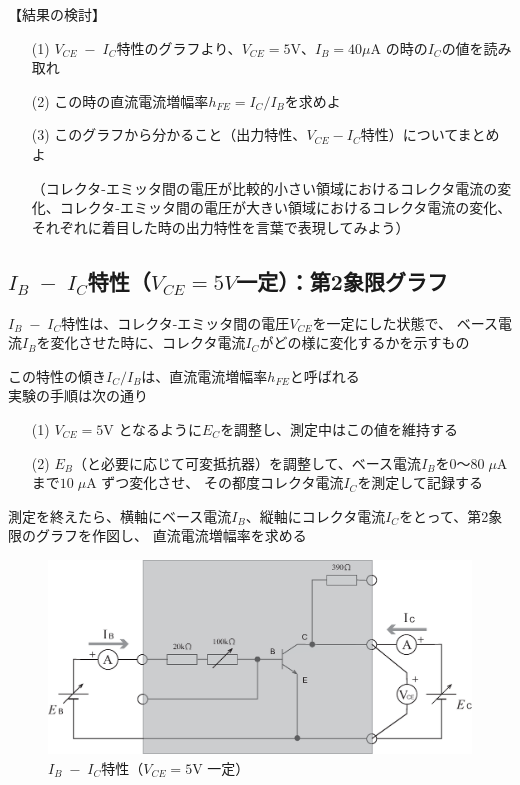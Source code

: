 \documentclass[uplatex,a4paper,11pt,oneside,openany]{jsbook}
\begin{document}
【結果の検討】

\begin{enumerate}
\item[(1)] $V_{CE}\;-\;I_C$特性のグラフより、$V_{CE}=5$V、$I_B=40\mu$A の時の$I_C$の値を読み取れ\\
\item[(2)] この時の直流電流増幅率$h_{FE}=I_C/I_B$を求めよ\\

\item[(3)] このグラフから分かること（出力特性、$V_{CE}-I_C$特性）についてまとめよ

	（コレクタ-エミッタ間の電圧が比較的小さい領域におけるコレクタ電流の変化、コレクタ-エミッタ間の電圧が大きい領域におけるコレクタ電流の変化、それぞれに着目した時の出力特性を言葉で表現してみよう）
\end{enumerate}

\newpage

\subsection{$I_B\;-\;I_C$特性（$V_{CE}=5V$一定）：第2象限グラフ}

$I_B\;-\;I_C$特性は、コレクタ-エミッタ間の電圧$V_{CE}$を一定にした状態で、
ベース電流$I_B$を変化させた時に、コレクタ電流$I_C$がどの様に変化するかを示すもの

この特性の傾き$I_C/I_B$は、直流電流増幅率$h_{FE}$と呼ばれる\\

実験の手順は次の通り

\begin{enumerate}
\item[(1)] $V_{CE}=5$V となるように$E_C$を調整し、測定中はこの値を維持する
\item[(2)] $E_B$（と必要に応じて可変抵抗器）を調整して、ベース電流$I_B$を$0$〜$80\;\mu$A まで$10\;\mu$A ずつ変化させ、
その都度コレクタ電流$I_C$を測定して記録する 
\end{enumerate}

測定を終えたら、横軸にベース電流$I_B$、縦軸にコレクタ電流$I_C$をとって、第2象限のグラフを作図し、
直流電流増幅率を求める

\vfill

\begin{figure}[H]
  \centering
   \includegraphics[keepaspectratio, scale=0.45, angle=0]
               {figs/eps/ex1.eps}
               \caption{$I_B\;-\;I_C$特性（$V_{CE}=5$V 一定）}
               \label{fig:ex2}
\end{figure}
\end{document}
